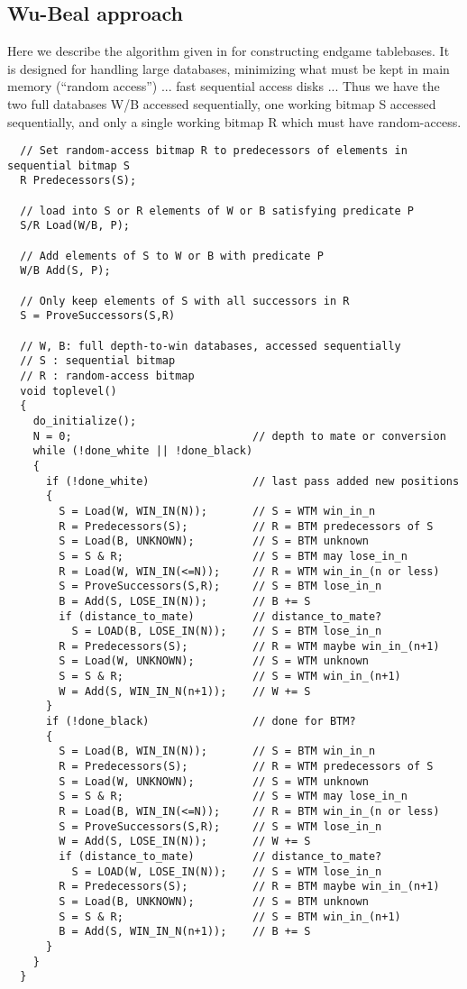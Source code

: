 \documentclass[10pt,dvipdfmx]{report}
\begin{document}
\subsection{Wu-Beal approach}
Here we describe the algorithm given in \cite{wu-beal} for constructing endgame tablebases.
It is designed for handling large databases, minimizing what must be kept in main memory
(``random access'') ... fast sequential access disks ...
Thus we have the two full databases W/B accessed sequentially,
one working bitmap S accessed sequentially,
and only a single working bitmap R which must have random-access.
\begin{verbatim}
  // Set random-access bitmap R to predecessors of elements in sequential bitmap S
  R Predecessors(S);

  // load into S or R elements of W or B satisfying predicate P
  S/R Load(W/B, P);

  // Add elements of S to W or B with predicate P
  W/B Add(S, P);

  // Only keep elements of S with all successors in R
  S = ProveSuccessors(S,R)

  // W, B: full depth-to-win databases, accessed sequentially
  // S : sequential bitmap
  // R : random-access bitmap
  void toplevel()
  {
    do_initialize();
    N = 0;                            // depth to mate or conversion
    while (!done_white || !done_black)
    {
      if (!done_white)                // last pass added new positions
      {
        S = Load(W, WIN_IN(N));       // S = WTM win_in_n
        R = Predecessors(S);          // R = BTM predecessors of S
        S = Load(B, UNKNOWN);         // S = BTM unknown
        S = S & R;                    // S = BTM may lose_in_n
        R = Load(W, WIN_IN(<=N));     // R = WTM win_in_(n or less)
        S = ProveSuccessors(S,R);     // S = BTM lose_in_n
        B = Add(S, LOSE_IN(N));       // B += S
        if (distance_to_mate)         // distance_to_mate?
          S = LOAD(B, LOSE_IN(N));    // S = BTM lose_in_n
        R = Predecessors(S);          // R = WTM maybe win_in_(n+1)
        S = Load(W, UNKNOWN);         // S = WTM unknown
        S = S & R;                    // S = WTM win_in_(n+1)
        W = Add(S, WIN_IN_N(n+1));    // W += S
      }
      if (!done_black)                // done for BTM?
      {
        S = Load(B, WIN_IN(N));       // S = BTM win_in_n
        R = Predecessors(S);          // R = WTM predecessors of S
        S = Load(W, UNKNOWN);         // S = WTM unknown
        S = S & R;                    // S = WTM may lose_in_n
        R = Load(B, WIN_IN(<=N));     // R = BTM win_in_(n or less)
        S = ProveSuccessors(S,R);     // S = WTM lose_in_n
        W = Add(S, LOSE_IN(N));       // W += S
        if (distance_to_mate)         // distance_to_mate?
          S = LOAD(W, LOSE_IN(N));    // S = WTM lose_in_n
        R = Predecessors(S);          // R = BTM maybe win_in_(n+1)
        S = Load(B, UNKNOWN);         // S = BTM unknown
        S = S & R;                    // S = BTM win_in_(n+1)
        B = Add(S, WIN_IN_N(n+1));    // B += S
      }
    }
  }
\end{verbatim}
\end{document}
